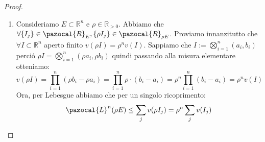 \documentclass[11pt,a4paper]{report}
\theoremstyle{plain}
\theoremstyle{definition}
\newcommand{\Le}{\pazocal{L}}
\newcommand{\Ml}{\pazocal{M}_{\Le^n}}
\begin{document}
\begin{proof}
\begin{enumerate}
		Proviamo ora la seconda parte del punto 3. Sia perci\'o $E \in \Ml$ dimostriamo che $E + \tau$ induce il buon spezzamento della misura e che quindi $(E + \tau) \in \Ml$. Ovvero proviamo che:
		\begin{equation}
			\Le^n(A) = \Le^n(A \cap (E + \tau)) + \Le^n(A \cap (E + \tau)^c)
		\end{equation}
		Sia $A \subset \mathbb{R}^n$ generico. Abbiamo che $A \cap (E + \tau) = (A + \tau - \tau)\cap(E + \tau)$. Vediamo che si tratta dell'intersezione di due insiemi traslati di $\tau$ ovvero $(A - \tau)$ e $E$, quindi lo sar\'a pure la loro intersezione, dunque possiamo prima intersecare e poi traslare, i.e. $((A + \tau) \cap E) + \tau$. Passando alla misura e tenendo conto che $\Le^n$ \'e invariante rispetto la traslazione:
		\begin{equation}
			\Le^n((A - \tau)\cap E) = \Le^n(A\cap (E + \tau))
		\end{equation}
		Ragionando allo stesso modo $A\cap(E + \tau)^c = (A + \tau - \tau)\cap(E + \tau)^c = (A + \tau - \tau)\cap(E^c + \tau) = ((A - \tau)\cap E^c) + \tau$. Quindi passando alla misura:
		\begin{equation}
			\Le^n((A - \tau)\cap E^c) = \Le^n(A\cap (E^c + \tau)^c)
		\end{equation}
		Sommando le equazioni 1.23 e 1.24 otteniamo:
		\begin{equation}
			\Le^n(A\cap (E + \tau)) + \Le^n(A\cap (E^c + \tau)^c) = \Le^n((A - \tau)\cap E) + \Le^n((A - \tau)\cap E^c)
		\end{equation}
		Siccome per ipotesi $E$ \'e misurabile possiamo riscrivere la parte destra di 1.25:
		\[
			\Le^n((A - \tau)\cap E) + \Le^n((A - \tau)\cap E^c) = \Le^n(A - \tau) = \Le^n(A)
		\]
		L'ultima uguaglianza \'e data per invarianza rispetto alla traslazione di $\Le^n$
		\item Consideriamo $E \subset \mathbb{R}^n$ e $\rho \in \mathbb{R}_{>0}$. Abbiamo che $\forall\{I_j\} \in \pazocal{R}_E, \{\rho I_j\} \in \pazocal{R}_{\rho E}$. Proviamo innanzitutto che $\forall I \subset \mathbb{R}^n$ aperto finito $v(\rho I) = \rho^n v(I)$. Sappiamo che $I := \bigotimes\limits_{i=1}^n(a_i,b_i)$ perci\'o $\rho I = \bigotimes\limits_{i=1}^n(\rho a_i,\rho b_i)$ quindi passando alla misura elementare otteniamo: 
		\[
			v(\rho I) = \prod\limits_{i=1}^n(\rho b_i - \rho a_i) = \prod\limits_{i=1}^n\rho \cdot (b_i - a_i) = \rho^n\prod\limits_{i=1}^n(b_i - a_i) = \rho^nv(I)
		\]
		Ora, per Lebesgue abbiamo che per un singolo ricoprimento:
		\[
			\Le^n(\rho E) \le \sum\limits_j v(\rho I_j) = \rho^n \sum\limits_j v(I_j)
\]
\end{enumerate}
\end{proof}
\end{document}
